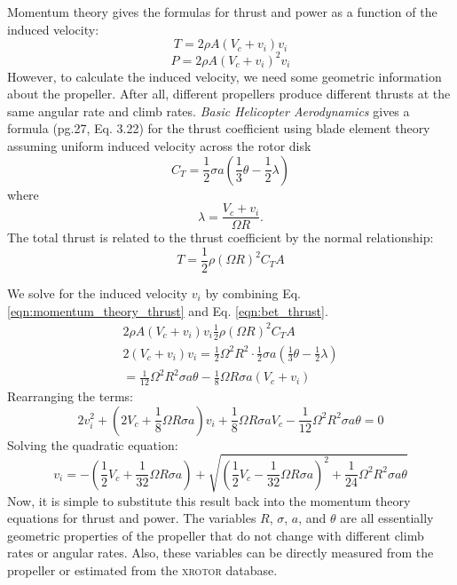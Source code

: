 \documentclass[11pt]{amsart}
\begin{document}
Momentum theory gives the formulas for thrust and power as a function
of the induced velocity:
\begin{equation}
  T = 2 \rho A (V_c + v_i) v_i
  \label{eqn:momentum_theory_thrust}
\end{equation}
\begin{equation}
  P = 2 \rho A (V_c + v_i)^2 v_i
\end{equation}
However, to calculate the induced velocity, we need some geometric
information about the propeller.  After all, different propellers
produce different thrusts at the same angular rate and climb rates.
\textit{Basic Helicopter Aerodynamics} gives a formula (pg.27, Eq. 3.22)
for the thrust coefficient using blade element theory assuming uniform
induced velocity across the rotor disk
\begin{equation}
  C_T = \frac{1}{2} \sigma a \left( \frac{1}{3} \theta - \frac{1}{2}
  \lambda \right)
\end{equation}
where
\begin{equation}
  \lambda = \frac{V_c + v_i}{\Omega R}.
\end{equation}
The total thrust is related to the thrust coefficient by the normal
relationship:
\begin{equation}
  T = \frac{1}{2} \rho (\Omega R)^2 C_T A
  \label{eqn:bet_thrust}
\end{equation}


We solve for the induced velocity $v_i$ by combining
Eq. \ref{eqn:momentum_theory_thrust} and Eq. \ref{eqn:bet_thrust}.
\begin{eqnarray*}
  2 \rho A (V_c + v_i) v_i  \frac{1}{2} \rho (\Omega R)^2 C_T A \\
  2 (V_c + v_i) v_i = \frac{1}{2} \Omega^2 R^2 \cdot \frac{1}{2} \sigma a
  \left( \frac{1}{3} \theta - \frac{1}{2} \lambda \right) \\
  = \frac{1}{12} \Omega^2 R^2 \sigma a \theta - \frac{1}{8} \Omega R \sigma a (V_c + v_i)
\end{eqnarray*}
Rearranging the terms:
\begin{equation}
  2 v_i^2 + \left(2 V_c + \frac{1}{8} \Omega R \sigma a\right) v_i +
  \frac{1}{8} \Omega R \sigma a V_c - \frac{1}{12} \Omega^2 R^2 \sigma a \theta
  = 0
\end{equation}
Solving the quadratic equation:
\begin{equation}
  v_i = -\left( \frac{1}{2} V_c + \frac{1}{32} \Omega R \sigma a \right)
  + \sqrt{ \left( \frac{1}{2} V_c - \frac{1}{32} \Omega R \sigma a \right)^2
    + \frac{1}{24} \Omega^2 R^2 \sigma a \theta}
\end{equation}
Now, it is simple to substitute this result back into the momentum
theory equations for thrust and power.  The variables $R$, $\sigma$,
$a$, and $\theta$ are all essentially geometric properties of the
propeller that do not change with different climb rates or angular
rates.  Also, these variables can be directly measured from the
propeller or estimated from the \textsc{xrotor} database.
\end{document}
